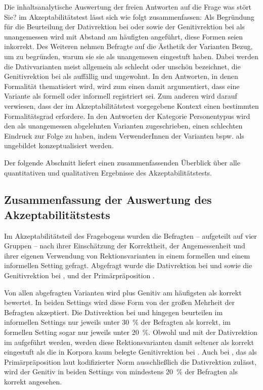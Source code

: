Die inhaltsanalytische Auswertung der freien Antworten auf die Frage \glqq was stört Sie?\grqq{} im Akzeptabilitätstest lässt sich wie folgt zusammenfassen:
Als Begründung für die Beurteilung der Dativrektion bei \wegen{} oder \waehrend{} sowie der Genitivrektion bei \gegenueber{} als unangemessen wird mit Abstand am häufigten angeführt, diese Formen seien inkorrekt. 
Des Weiteren nehmen Befragte auf die Ästhetik der Varianten Bezug, um zu begründen, warum sie sie als unangemesen eingestuft haben. 
Dabei werden die Dativvarianten meist allgemein als schlecht oder unschön bezeichnet, die Genitivrektion bei \gegenueber{} als auffällig und ungewohnt. 
In den Antworten, in denen Formalität thematisiert wird, wird zum einen damit argumentiert, dass eine Variante als formell oder informell registriert sei. 
Zum anderen wird darauf verwiesen, dass der im Akzeptabilitätstest vorgegebene Kontext einen bestimmten Formalitätsgrad erfordere. 
In den Antworten der Kategorie \glqq Personentypus\grqq{} wird den als unangemessen abgelehnten Varianten zugeschrieben, einen schlechten Eindruck zur Folge zu haben, indem VerwenderInnen der Varianten bspw. als ungebildet konzeptualisiert werden.

Der folgende Abschnitt liefert einen zusammenfassenden Überblick über alle quantitativen und qualitativen Ergebnisse des Akzeptabilitätstests. 
\subsection{Zusammenfassung der Auswertung des Akzeptabilitätstests}
\label{sec:ZsfsgAkz}
Im Akzeptabilitätsteil des Fragebogens wurden die Befragten -- aufgeteilt auf vier Gruppen -- nach ihrer Einschätzung der Korrektheit, der Angemessenheit und ihrer eigenen Verwendung von Rektionsvarianten in einem formellen und einem informellen Setting gefragt.
Abgefragt wurde die Dativrektion bei \wegen{} und \waehrend{} sowie die Genitivrektion bei \dank{}, \gegenueber{} und der Primärpräposition .

Von allen abgefragten Varianten wird \dank{} plus Genitiv am häufigsten als korrekt bewertet. 
In beiden Settings wird diese Form von der großen Mehrheit der Befragten akzeptiert. 
Die Dativrektion bei \wegen{} und \waehrend{} hingegen beurteilen im informellen Settings nur jeweils unter 30~\% der Befragten als korrekt, im formellen Setting sogar nur jeweils unter 20~\%. 
Obwohl \wegen{} und \waehrend{} mit der Dativrektion im \citet[915]{Duden2016} aufgeführt werden, werden diese Rektionsvarianten damit seltener als korrekt eingestuft als die in Korpora kaum belegte Genitivrektion bei \gegenueber{}. 
Auch bei , das als Primärpräposition laut kodifizierter Norm ausschließlich die Dativrektion zulässt, wird der Genitiv in beiden Settings von mindestens 20~\% der Befragten als korrekt angesehen. 

